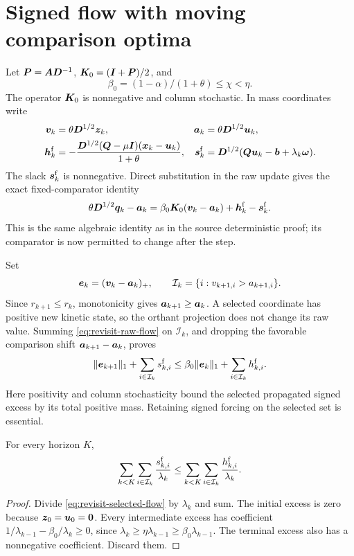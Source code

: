 \section{Signed flow with moving comparison optima}
Let $\bm{P}=\bm{A}\bm{D}^{-1}$, $\bm{K}_0=(\bm{I}+\bm{P})/2$, and
\[
 \beta_0=(1-\alpha)/(1+\theta)\leq\chi<\eta.
\]
The operator $\bm{K}_0$ is nonnegative and column stochastic. In mass
coordinates write
\begin{equation}
 \begin{aligned}
 \bm{v}_k&=\theta\bm{D}^{1/2}\bm{z}_k,
 &\bm{a}_k&=\theta\bm{D}^{1/2}\bm{u}_k,\\
 \bm{h}_k^{\rm f}&=-\frac{\bm{D}^{1/2}(\bm{Q}-\mu\bm{I})
                                      (\bm{x}_k-\bm{u}_k)}{1+\theta},
 &\bm{s}_k^{\rm f}&=\bm{D}^{1/2}
                (\bm{Q}\bm{u}_k-\bm{b}+\lambda_k\bm{\omega}).
 \end{aligned}
 \label{eq:revisit-flow-objects}
\end{equation}
The slack $\bm{s}_k^{\rm f}$ is nonnegative. Direct substitution in the raw
update gives the exact fixed-comparator identity
\begin{equation}
 \theta\bm{D}^{1/2}\bm{q}_k-\bm{a}_k
       =\beta_0\bm{K}_0(\bm{v}_k-\bm{a}_k)+\bm{h}_k^{\rm f}-\bm{s}_k^{\rm f}.
 \label{eq:revisit-raw-flow}
\end{equation}
This is the same algebraic identity as in the source deterministic proof;
its comparator is now permitted to change after the step.

Set
\[
 \bm{e}_k=(\bm{v}_k-\bm{a}_k)_+,\qquad
 \mathcal I_k=\{i:v_{k+1,i}>a_{k+1,i}\}.
\]
Since $r_{k+1}\leq r_k$, monotonicity gives
$\bm{a}_{k+1}\geq\bm{a}_k$. A selected coordinate has positive new kinetic
state, so the orthant projection does not change its raw value.
Summing \cref{eq:revisit-raw-flow} on $\mathcal I_k$, and dropping the
favorable comparison shift $\bm{a}_{k+1}-\bm{a}_k$, proves
\begin{equation}
 \|\bm{e}_{k+1}\|_1+\sum_{i\in\mathcal I_k}s_{k,i}^{\rm f}
   \leq\beta_0\|\bm{e}_k\|_1
                   +\sum_{i\in\mathcal I_k}h_{k,i}^{\rm f}.
 \label{eq:revisit-selected-flow}
\end{equation}
Here positivity and column stochasticity bound the selected propagated
signed excess by its total positive mass. Retaining signed forcing on
the selected set is essential.

\begin{lemma}
\label{lem:revisit-weighted-flow}
For every horizon $K$,
\begin{equation}
 \sum_{k<K}\sum_{i\in\mathcal I_k}
                          \frac{s_{k,i}^{\rm f}}{\lambda_k}
 \leq\sum_{k<K}\sum_{i\in\mathcal I_k}
                          \frac{h_{k,i}^{\rm f}}{\lambda_k}.
 \label{eq:revisit-weighted-flow}
\end{equation}
\end{lemma}
\begin{proof}
Divide \cref{eq:revisit-selected-flow} by $\lambda_k$ and sum.
The initial excess is zero because $\bm{z}_0=\bm{u}_0=\bm{0}$.
Every intermediate excess has coefficient
$1/\lambda_{k-1}-\beta_0/\lambda_k\geq0$, since
$\lambda_k\geq\eta\lambda_{k-1}\geq\beta_0\lambda_{k-1}$.
The terminal excess also has a nonnegative coefficient. Discard them.
\end{proof}

